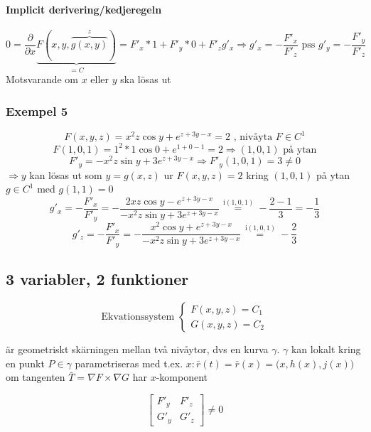 \documentclass{article}
\begin{document}
\paragraph{Implicit derivering/kedjeregeln}

\[
	0 = \frac{\partial}{\partial x} \underbrace{F(x,y,\overbrace{g(x,y)}^z)}_{=C} = F'_x * 1 + F'_y * 0 + F'_zg'_x \Rightarrow g'_x = - \frac{F'_x}{F'_z} \text{ pss } g'_y = - \frac{F'_y}{F'_z}
\]
Motsvarande om \(x\) eller \(y\) ska lösas ut

\subsubsection{Exempel 5}
\begin{equation} \label{eq:8.7}
	F(x,y,z) = x^2z\cos{y} + e^{z + 3y - x} = 2 \text{ , nivåyta } F \in C^1
\end{equation}
\[
	F(1,0,1) = 1^2 * 1\cos{0} + e ^{1+0-1} = 2 \Rightarrow (1,0,1) \text{ på ytan}
\]
\[
	F'_y = - x^2z\sin{y} + 3e^{z+3y-x} \Rightarrow F'_y(1,0,1) = 3 \neq 0
\]
\(\Rightarrow y\) kan lösas ut som \(y = g(x,z)\) ur \(F(x,y,z) = 2\) kring \((1,0,1)\) på ytan \(g \in C^1\) med \(g(1,1) = 0\)
\[
	g'_x = - \frac{F'_x}{F'_y} = - \frac{2xz\cos{y} - e^{z+3y-x}}{- x^2z\sin{y} + 3e^{z+3y-x}} \overset{\,\mathrm{i (1,0,1)}}{=} - \frac{2-1}{3} = - \frac{1}{3}
\]
\[
	g'_z = - \frac{F'_x}{F'_y} = - \frac{x^2\cos{y} + e^{z+3y-x}}{- x^2z\sin{y} + 3e^{z+3y-x}} \overset{\,\mathrm{i (1,0,1)}}{=} - \frac{2}{3}
\]

\subsection{3 variabler, 2 funktioner}

\[
\text{Ekvationssystem }
\left\{\begin{array}{rcl}
	F(x,y,z) = C_1 \\
	G(x,y,z) = C_2
\end{array}\right.
\]

är geometriskt skärningen mellan två nivåytor, dvs en kurva \(\gamma\). \newline
\(\gamma\) kan lokalt kring en punkt \(P \in \gamma\) parametriseras med t.ex. \(x: \bar{r}(t) = \bar{r}(x) = \Big(x,h(x),j(x)\Big)\) om tangenten \newline
\(\bar{T} = \nabla F \times \nabla G\) har \(x\)-komponent

\[\begin{bmatrix}
	F'_y & F'_z \\
	G'_y & G'_z
\end{bmatrix}\neq 0\]
\end{document}
